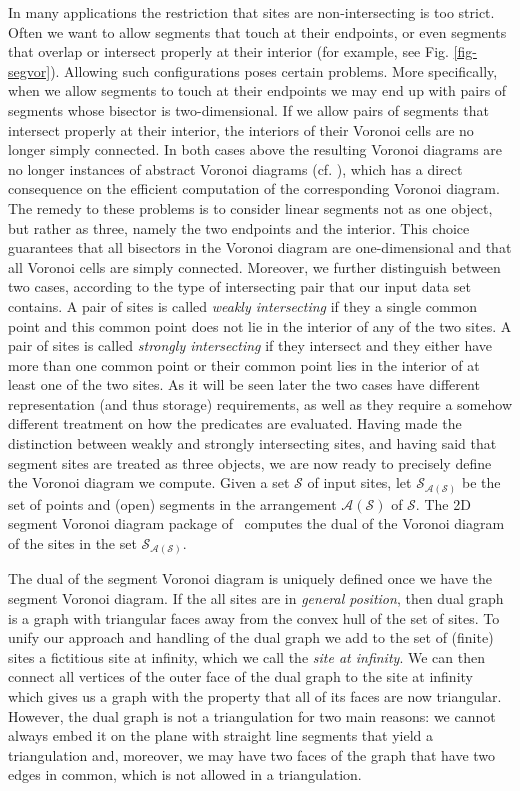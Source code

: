 In many applications the restriction that sites are non-intersecting
is too strict. Often we want to allow segments that touch at their
endpoints, or even segments that overlap or intersect properly at
their interior (for example, see Fig. \ref{fig-segvor}). Allowing such
configurations poses certain problems. More specifically, when we allow
segments to touch at their endpoints we may end up with pairs of
segments whose bisector is two-dimensional. If we allow pairs of
segments that intersect properly at their interior, the interiors of
their Voronoi cells are no longer simply connected. In both cases
above the resulting Voronoi diagrams are no longer instances of
abstract Voronoi diagrams (cf. \cite{k-cavd-89}), which has a direct
consequence on the efficient computation of the corresponding Voronoi
diagram. The remedy to these problems is to consider linear segments
not as one object, but rather as three, namely the two endpoints and
the interior. This choice guarantees that all bisectors in the Voronoi
diagram are one-dimensional and that all Voronoi cells are simply
connected. Moreover, we further distinguish between two cases,
according to the type of intersecting pair that our input data set
contains. A pair of sites is called \emph{weakly intersecting} if they
a single common point and this common point does not lie in the
interior of any of the two sites. A pair of sites is called
\emph{strongly intersecting} if they intersect and they either have
more than one common point or their common point lies in the interior
of at least one of the two sites. As it will be seen later the two
cases have different representation (and thus storage) requirements,
as well as they require a somehow different treatment on how the
predicates are evaluated. Having made the distinction between weakly
and strongly intersecting sites, and having said that segment sites
are treated as three objects, we are now ready to precisely define the
Voronoi diagram we compute. Given a set $\mathcal{S}$ of input sites,
let $\mathcal{S}_{\mathcal{A}(\mathcal{S})}$ be the set of points and
(open) segments in the arrangement $\mathcal{A}(\mathcal{S})$ of
$\mathcal{S}$. The 2D segment Voronoi diagram package of \cgal\
computes the dual of the Voronoi diagram of the sites in the set 
$\mathcal{S}_{\mathcal{A}(\mathcal{S})}$.

The dual of the segment Voronoi diagram is uniquely defined once we
have the segment Voronoi diagram. If the all sites are in
\emph{general position}, then dual graph is a graph with triangular
faces away from the convex hull of the set of sites. To unify our approach
and handling of the dual graph we add to the set of (finite) sites
a fictitious site at infinity, which we call the
{\em site at infinity}. We can then connect all vertices of the outer
face of the dual graph to the site at infinity which gives us
a graph with the property that all of its faces are now
triangular. However, the dual graph is not a triangulation for
two main reasons: we cannot always embed it on the plane with straight
line segments that yield a triangulation and, moreover, we may have two
faces of the graph that have two edges in common, which is not allowed
in a triangulation.

